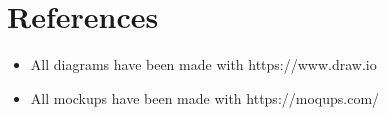 \chapter{References}
\begin{itemize}
    \item All diagrams have been made with https://www.draw.io
    \item All mockups have been made with https://moqups.com/
\end{itemize}

